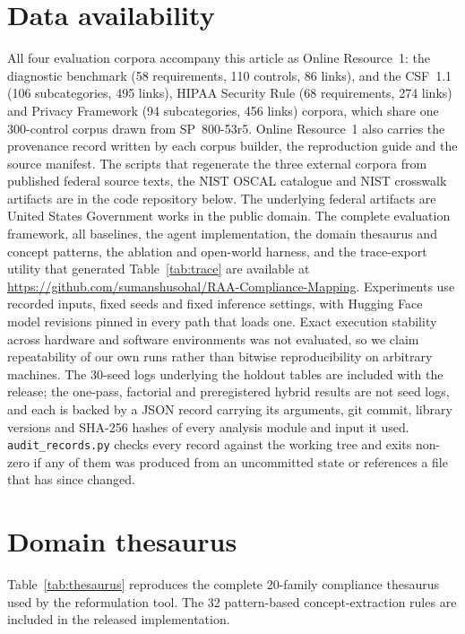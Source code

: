\documentclass[a4paper,fleqn]{cas-sc}
\begin{document}
\section*{Data availability}
All four evaluation corpora accompany this article as Online Resource~1: the diagnostic benchmark (58 requirements, 110 controls, 86 links), and the CSF~1.1 (106 subcategories, 495 links), HIPAA Security Rule (68 requirements, 274 links) and Privacy Framework (94 subcategories, 456 links) corpora, which share one 300-control corpus drawn from SP~800-53r5. Online Resource~1 also carries the provenance record written by each corpus builder, the reproduction guide and the source manifest. The scripts that regenerate the three external corpora from published federal source texts, the NIST OSCAL catalogue and NIST crosswalk artifacts are in the code repository below. The underlying federal artifacts are United States Government works in the public domain.
The complete evaluation framework, all baselines, the agent implementation, the domain thesaurus and concept patterns, the ablation and open-world harness, and the trace-export utility that generated Table~\ref{tab:trace} are available at \url{https://github.com/sumanshusohal/RAA-Compliance-Mapping}.
Experiments use recorded inputs, fixed seeds and fixed inference settings, with Hugging Face model revisions pinned in every path that loads one. Exact execution stability across hardware and software environments was not evaluated, so we claim repeatability of our own runs rather than bitwise reproducibility on arbitrary machines.
The 30-seed logs underlying the holdout tables are included with the release; the one-pass, factorial and preregistered hybrid results are not seed logs, and each is backed by a JSON record carrying its arguments, git commit, library versions and SHA-256 hashes of every analysis module and input it used.
\texttt{audit\_records.py} checks every record against the working tree and exits non-zero if any of them was produced from an uncommitted state or references a file that has since changed.

\appendix
\section{Domain thesaurus}
\label{app:thesaurus}

Table~\ref{tab:thesaurus} reproduces the complete 20-family compliance thesaurus used by the reformulation tool.
The 32 pattern-based concept-extraction rules are included in the released implementation.
\end{document}
